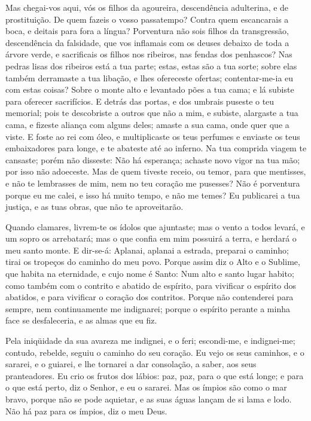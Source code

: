 Mas chegai-vos aqui, vós os filhos da agoureira, descendência
adulterina, e de prostituição. De quem fazeis o vosso
passatempo? Contra quem escancarais a boca, e deitais para fora a
língua? Porventura não sois filhos da transgressão, descendência da
falsidade, que vos inflamais com os deuses debaixo de toda a
árvore verde, e sacrificais os filhos nos ribeiros, nas fendas dos
penhascos? Nas pedras lisas dos ribeiros está a tua parte;
estas, estas são a tua sorte; sobre elas também derramaste a tua
libação, e lhes ofereceste ofertas; contentar-me-ia eu com estas
coisas? Sobre o monte alto e levantado pões a tua cama; e lá
subiste para oferecer sacrifícios. E detrás das portas, e dos
umbrais puseste o teu memorial; pois te descobriste a outros que não
a mim, e subiste, alargaste a tua cama, e fizeste aliança com alguns
deles; amaste a sua cama, onde quer que a viste. E foste ao rei
com óleo, e multiplicaste os teus perfumes e enviaste os teus
embaixadores para longe, e te abateste até ao inferno. Na tua
comprida viagem te cansaste; porém não disseste: Não há esperança;
achaste novo vigor na tua mão; por isso não adoeceste. Mas de
quem tiveste receio, ou temor, para que mentisses, e não te
lembrasses de mim, nem no teu coração me pusesses? Não é porventura
porque eu me calei, e isso há muito tempo, e não me temes? Eu
publicarei a tua justiça, e as tuas obras, que não te aproveitarão.

Quando clamares, livrem-te os ídolos que ajuntaste; mas o vento a
todos levará, e um sopro os arrebatará; mas o que confia em mim
possuirá a terra, e herdará o meu santo monte. E dir-se-á:
Aplanai, aplanai a estrada, preparai o caminho; tirai os tropeços do
caminho do meu povo. Porque assim diz o Alto e o Sublime, que
habita na eternidade, e cujo nome é Santo: Num alto e santo lugar
habito; como também com o contrito e abatido de espírito, para
vivificar o espírito dos abatidos, e para vivificar o coração dos
contritos. Porque não contenderei para sempre, nem
continuamente me indignarei; porque o espírito perante a minha face
se desfaleceria, e as almas que eu fiz.

Pela iniqüidade da sua avareza me indignei, e o feri; escondi-me,
e indignei-me; contudo, rebelde, seguiu o caminho do seu coração.
Eu vejo os seus caminhos, e o sararei, e o guiarei, e lhe
tornarei a dar consolação, a saber, aos seus pranteadores. Eu
crio os frutos dos lábios: paz, paz, para o que está longe; e para o
que está perto, diz o Senhor, e eu o sararei. Mas os ímpios
são como o mar bravo, porque não se pode aquietar, e as suas águas
lançam de si lama e lodo. Não há paz para os ímpios, diz o
meu Deus.


